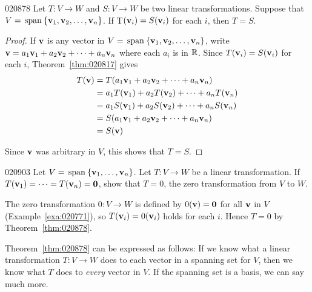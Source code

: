 \begin{theorem}{}{020878}
Let $T : V \to W$ and $S : V \to W$ be two linear transformations. Suppose that $V = \thinspace\operatorname{span\medspace}\{\textbf{v}_{1}, \textbf{v}_{2}, \dots, \textbf{v}_{n}\}$. If T$(\textbf{v}_{i}) = S(\textbf{v}_{i})$ for each $i$, then $T = S$.
\end{theorem}

\begin{proof}
If $\textbf{v}$ is any vector in $V = \thinspace\operatorname{span\medspace}\{\textbf{v}_{1}, \textbf{v}_{2}, \dots, \textbf{v}_{n}\}$, write $\textbf{v} = a_{1}\textbf{v}_{1} + a_{2}\textbf{v}_{2} + \cdots + a_{n}\textbf{v}_{n}$ where each $a_{i}$ is in $\mathbb{R}$. Since $T(\textbf{v}_{i}) = S(\textbf{v}_{i})$ for each $i$, Theorem~\ref{thm:020817} gives
\begin{align*}
T(\textbf{v}) &= T(a_1\textbf{v}_1 + a_2\textbf{v}_2 + \cdots + a_n\textbf{v}_n) \\
&= a_1T(\textbf{v}_1) + a_2T(\textbf{v}_2) + \cdots + a_nT(\textbf{v}_n) \\
&= a_1S(\textbf{v}_1) + a_2S(\textbf{v}_2) + \cdots + a_nS(\textbf{v}_n) \\
&= S(a_1\textbf{v}_1 + a_2\textbf{v}_2 + \cdots + a_n\textbf{v}_n) \\
&= S(\textbf{v})
\end{align*}

Since $\textbf{v}$ was arbitrary in $V$, this shows that $T = S$.
\end{proof}

\begin{example}{}{020903}
Let $V = \thinspace\operatorname{span\medspace}\{\textbf{v}_{1}, \dots, \textbf{v}_{n}\}$. Let $T : V \to W$ be a linear transformation. If $T(\textbf{v}_{1}) = \cdots = T(\textbf{v}_{n}) = \textbf{0}$, show that $T = 0$, the zero transformation from $V$ to $W$.


\begin{solution}
  The zero transformation $0 : V \to W$ is defined by $0(\textbf{v}) = \textbf{0}$ for all $\textbf{v}$ in $V$ (Example~\ref{exa:020771}), so $T(\textbf{v}_{i}) = 0(\textbf{v}_{i})$ holds for each $i$. Hence $T = 0$ by Theorem~\ref{thm:020878}.
\end{solution}
\end{example}

Theorem~\ref{thm:020878} can be expressed as follows: If we know what a linear transformation $T : V \to W$ does to each vector in a spanning set for $V$, then we know what $T$ does to \textit{every} vector in $V$. If the spanning set is a basis, we can say much more.


